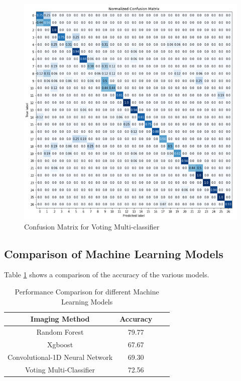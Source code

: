 \documentclass[conference]{IEEEtran}
\begin{document}
\begin{figure}[H]
\begin{center}
\includegraphics[scale=1]{Image/vote_27_class_confusion.png}
\caption{\label{vote_27_class_confusion} Confusion Matrix for Voting Multi-classifier}
\end{center}
\end{figure}

\subsection{Comparison of Machine Learning Models}

Table \ref{tbl:compare_ml} shows a comparison of the accuracy of the various models.
\begin{table}[H] 
\begin{center}
\caption{Performance Comparison for different Machine Learning Models} \label{tbl:compare_ml}
\begin{tabular}{|c|c|c|c|}
\hline
Imaging Method & Accuracy \\
\hline
Random Forest  & 79.77  \\
\hline
Xgboost & 67.67  \\
\hline
Convolutional-1D Neural Network & 69.30  \\
\hline
Voting Multi-Classifier & 72.56  \\
\hline
\end{tabular}
\end{center}
\end{table}
\end{document}
